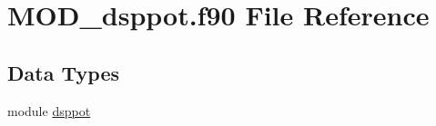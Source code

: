 \hypertarget{MOD__dsppot_8f90}{\section{M\-O\-D\-\_\-dsppot.\-f90 File Reference}
\label{MOD__dsppot_8f90}
}
\subsection*{Data Types}
\begin{DoxyCompactItemize}
\item 
module \hyperlink{classdsppot}{dsppot}
\end{DoxyCompactItemize}
